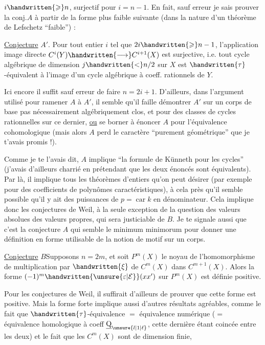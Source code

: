 $i\handwritten{\geqslant} n$, surjectif pour $i=n-1$. En fait, sauf erreur je sais prouver la conj.$A$ à partir de la forme plus faible suivante (dans la nature d'un théorème de Lefschetz ``faible'') :

\uline{Conjecture} $A'$. Pour tout entier $i$ tel que $2i\handwritten{\geqslant} n-1$, l'application image directe $C^i(Y)\handwritten{\longrightarrow} C^{i+1}(X)$ est surjective, i.e. tout cycle algébrique de dimension $j\handwritten{<}n/2$ sur $X$ est $\handwritten{\tau}$-équivalent à l'image d'un cycle algébrique à coeff. rationnels de $Y$.

Ici encore il suffit sauf erreur de faire $n=2i+1$. D'ailleurs, dans l'argument utilisé pour ramener $A$ à $A'$, il semble qu'il faille démontrer $A'$ sur un corps de base pas nécessairement algébriquement clos, et pour des classes de cycles rationnelles sur ce dernier, \uline{ou} se borner à énoncer $A$ pour l'équivalence cohomologique (mais alors $A$ perd le caractère ``purement géométrique'' que je t'avais promis !).

Comme je te l'avais dit, $A$ implique ``la formule de Künneth pour les cycles'' (j'avais d'ailleurs charrié en prétendant que les deux énoncés sont équivalents). Par là, il implique tous les théorèmes d'entiers qu'on peut désirer (par exemple pour des coefficients de polynômes caractéristiques), à cela près qu'il semble possible qu'il y ait des puissances de $p=\operatorname{car} k$ en dénominateur. Cela implique donc les conjectures de Weil, à la seule exception de la question des valeurs absolues des valeurs propres, qui sera justiciable de $B$. Je te signale aussi que c'est la conjecture $A$ qui semble le minimum minimorum pour donner une définition en forme utilisable de la notion de motif sur un corps.

\uline{Conjecture} $B$\quad Supposons $n=2m$, et soit $P^m(X)$ le noyau de l'homomorphisme de multiplication par $\handwritten{\xi}$ de $C^m(X)$ dans $C^{m+1}(X)$. Alors la forme $(-1)^m\handwritten{\unsure{\varepsilon|\mathcal{E}}}(xx')$ sur $P^m(X)$ est définie positive.

Pour les conjectures de Weil, il suffirait d'ailleurs de prouver que cette forme est positive. Mais la forme forte implique aussi d'autres résultats agréables, comme le fait que $\handwritten{\tau}$-équivalence $=$ équivalence numérique ($=$ équivalence homologique à coeff $\underline{\mathrm{Q}}_{\unsure{l|1|\ell}}$, cette dernière étant coincée entre les deux) et le fait que les $C^m(X)$ sont de dimension finie,
